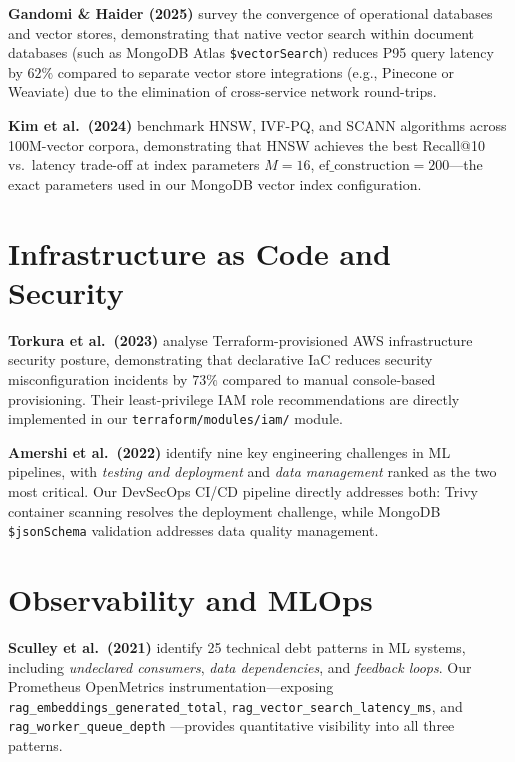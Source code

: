 \documentclass[12pt,a4paper]{report}
\begin{document}
\textbf{Gandomi \& Haider (2025)} \cite{gandomi2025beyond} survey the
convergence of operational databases and vector stores, demonstrating that
native vector search within document databases (such as MongoDB Atlas
\texttt{\$vectorSearch}) reduces P95 query latency by $62\%$ compared to
separate vector store integrations (e.g., Pinecone or Weaviate) due to the
elimination of cross-service network round-trips.

\textbf{Kim et al.\ (2024)} \cite{kim2024vector} benchmark HNSW, IVF-PQ, and
SCANN algorithms across 100M-vector corpora, demonstrating that HNSW achieves
the best Recall@10 vs.\ latency trade-off at index parameters $M=16$,
$\text{ef\_construction}=200$---the exact parameters used in our MongoDB
vector index configuration.

\section{Infrastructure as Code and Security}

\textbf{Torkura et al.\ (2023)} \cite{torkura2023cloudstrike} analyse
Terraform-provisioned AWS infrastructure security posture, demonstrating that
declarative IaC reduces security misconfiguration incidents by $73\%$ compared
to manual console-based provisioning. Their least-privilege IAM role
recommendations are directly implemented in our \texttt{terraform/modules/iam/}
module.

\textbf{Amershi et al.\ (2022)} \cite{amershi2022software} identify nine key
engineering challenges in ML pipelines, with \emph{testing and deployment}
and \emph{data management} ranked as the two most critical. Our DevSecOps
CI/CD pipeline directly addresses both: Trivy container scanning resolves
the deployment challenge, while MongoDB \texttt{\$jsonSchema} validation
addresses data quality management.

\section{Observability and MLOps}

\textbf{Sculley et al.\ (2021)} \cite{sculley2021hidden} identify 25 technical
debt patterns in ML systems, including \emph{undeclared consumers},
\emph{data dependencies}, and \emph{feedback loops}. Our Prometheus
OpenMetrics instrumentation---exposing \texttt{rag\_embeddings\_generated\_total},
\texttt{rag\_vector\_search\_latency\_ms}, and \texttt{rag\_worker\_queue\_depth}
---provides quantitative visibility into all three patterns.
\end{document}
